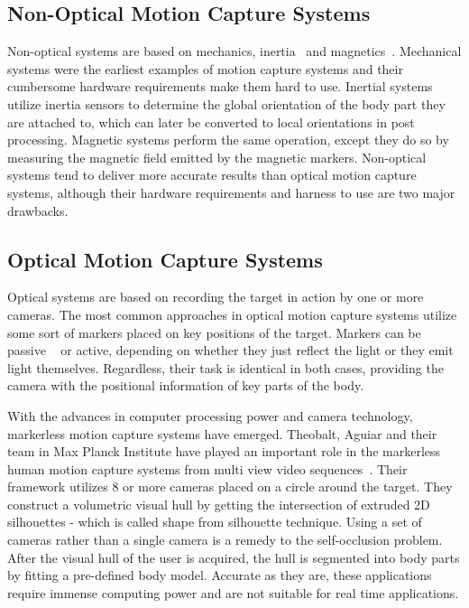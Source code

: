 \subsection{Non-Optical Motion Capture Systems}
 
Non-optical systems are based on mechanics, inertia~\cite{Miller2004} and magnetics~\cite{Yabukami2000}. Mechanical systems were the earliest examples of motion capture systems and their cumbersome hardware requirements make them hard to use. Inertial systems utilize inertia sensors to determine the global orientation of the body part they are attached to, which can later be converted to local orientations in post processing. Magnetic systems perform the same operation, except they do so by measuring the magnetic field emitted by the magnetic markers. Non-optical systems tend to deliver more accurate results than optical motion capture systems, although their hardware requirements and harness to use are two major drawbacks. 
 
\subsection{Optical Motion Capture Systems}

Optical systems are based on recording the target in action by one or more cameras. The most common approaches in optical motion capture systems utilize some sort of markers placed on key positions of the target. Markers can be passive ~\cite{Sementille2004} or active\cite{Maletsky2007}, depending on whether they just reflect the light or they emit light themselves. Regardless, their task is identical in both cases, providing the camera with the positional information of key parts of the body. 
 
With the advances in computer processing power and camera technology, markerless motion capture systems have emerged\cite{Cheung2003}. Theobalt, Aguiar and their team in Max Planck Institute have played an important role in the markerless human motion capture systems from multi view video sequences~\cite{Aguiar2007,Gall2009,Liu2011}. Their framework utilizes 8 or more cameras placed on a circle around the target. They construct a volumetric visual hull by getting the intersection of extruded 2D silhouettes - which is called shape from silhouette technique\cite{Cheung2000,Cheung2005}. Using a set of cameras rather than a single camera is a remedy to the self-occlusion problem. After the visual hull of the user is acquired, the hull is segmented into body parts by fitting a pre-defined body model. Accurate as they are, these
applications require immense computing power and are not suitable for real time applications. 
 
